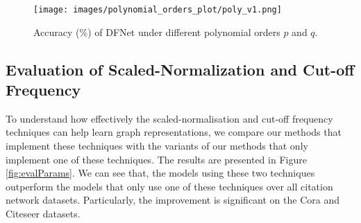 \documentclass{article}
\begin{document}
\begin{figure}[!h]
\vspace{-0.3cm}
\centering
\texttt{[image: images/polynomial\_orders\_plot/poly\_v1.png]}
\caption{Accuracy (\%) of DFNet under different polynomial orders $p$ and $q$.}
    \label{fig:polynomialPlots}
\end{figure}

\subsection{Evaluation of Scaled-Normalization and Cut-off Frequency}
\begin{comment}
\begin{wraptable}{r}{0.45\textwidth}
\resizebox{0.45\columnwidth}{!}{\begin{tabular}{|c| l| c c c|} 
\specialrule{.1em}{.05em}{.05em} 
Case & Model & Cora & Citeseer & Pubmed \\ [0.5ex] 
\hline 
\multirow{3}{*}{1} & DFNet & \textbf{85.2} & \textbf{74.2} & \textbf{84.3} \\ 
& DFNet-ATT & \textbf{86.0} & \textbf{74.7} & \textbf{85.2} \\ 
& DF-ATT & \textbf{83.4} & \textbf{73.1} & \textbf{82.3} \\ 
\hline 
\multirow{3}{*}{2} & DFNet & 46.6 & 33.2 & 82.8 \\ 
& DFNet-ATT & 45.1 & 47.2 & 81.1 \\ 
& DF-ATT & 73.9 & 58.5 & 71.8 \\ 
\hline 
\multirow{3}{*}{3} & DFNet & 35.6 & 28.7 & 70.2 \\ 
& DFNet-ATT & 30.9 & 25.3 & 82.4 \\ 
& DF-ATT & 76.3 & 66.5 & 81.3 \\ 
\specialrule{.1em}{.05em}{.05em}
\end{tabular}}\caption{Accuracy (\%) of our models in three cases: (1) using both scaled-normalization and cutoff frequency, (2) not using scaled-normalization, and (3) not using cutoff frequency.  \label{Tab:normalization-cutoff}}
\end{wraptable}
\end{comment}
To understand how effectively the scaled-normalisation and cut-off frequency techniques can help learn graph representations, we compare our methods that implement these techniques with the variants of our methods that only implement one of these techniques. The results are presented in Figure \ref{fig:evalParams}. We can see that, the models using these two techniques outperform the models that only use one of these techniques over all citation network datasets. Particularly, the improvement is significant on the Cora and Citeseer datasets.
\end{document}
